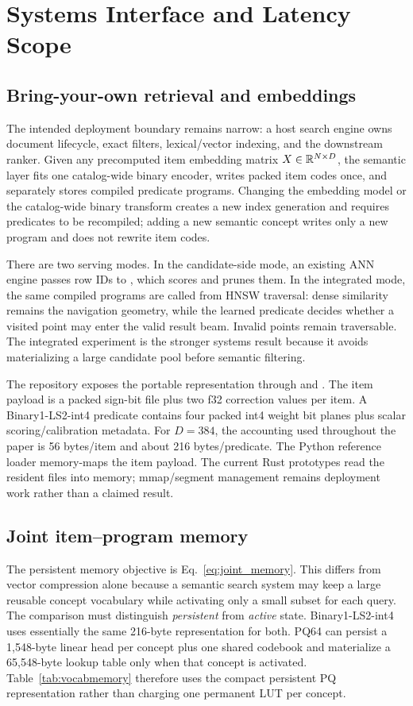 \section{Systems Interface and Latency Scope}
\label{sec:systems}

\subsection{Bring-your-own retrieval and embeddings}
The intended deployment boundary remains narrow: a host search engine owns document lifecycle, exact filters, lexical/vector indexing, and the downstream ranker. Given any precomputed item embedding matrix $X\in\mathbb{R}^{N\times D}$, the semantic layer fits one catalog-wide binary encoder, writes packed item codes once, and separately stores compiled predicate programs. Changing the embedding model or the catalog-wide binary transform creates a new index generation and requires predicates to be recompiled; adding a new semantic concept writes only a new program and does not rewrite item codes.

There are two serving modes. In the candidate-side mode, an existing ANN engine passes row IDs to , which scores and prunes them. In the integrated mode, the same compiled programs are called from HNSW traversal: dense similarity remains the navigation geometry, while the learned predicate decides whether a visited point may enter the valid result beam. Invalid points remain traversable. The integrated experiment is the stronger systems result because it avoids materializing a large candidate pool before semantic filtering.

The repository exposes the portable representation through  and . The item payload is a packed sign-bit file plus two f32 correction values per item. A Binary1-LS2-int4 predicate contains four packed int4 weight bit planes plus scalar scoring/calibration metadata. For $D=384$, the accounting used throughout the paper is 56 bytes/item and about 216 bytes/predicate. The Python reference loader memory-maps the item payload. The current Rust prototypes read the resident files into memory; mmap/segment management remains deployment work rather than a claimed result.

\subsection{Joint item--program memory}
The persistent memory objective is Eq.~\ref{eq:joint_memory}. This differs from vector compression alone because a semantic search system may keep a large reusable concept vocabulary while activating only a small subset for each query. The comparison must distinguish \emph{persistent} from \emph{active} state. Binary1-LS2-int4 uses essentially the same 216-byte representation for both. PQ64 can persist a 1,548-byte linear head per concept plus one shared codebook and materialize a 65,548-byte lookup table only when that concept is activated. Table~\ref{tab:vocabmemory} therefore uses the compact persistent PQ representation rather than charging one permanent LUT per concept.

